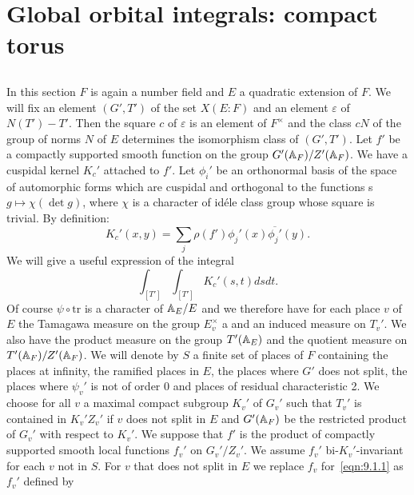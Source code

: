 \section{Global orbital integrals: compact torus}

\subsection{}

In this section $F$ is again a number field and $E$ a quadratic extension of $F$.
We will fix an element $(G', T')$ of the set $X(E:F)$ and an element $\varepsilon$ of $N(T')-T'$.
Then the square $c$ of $\varepsilon$ is an element of $F^\times$ and the class $cN$ of the group of norms $N$ of $E$ 
determines the isomorphism class of $(G', T')$.
Let $f'$ be a compactly supported smooth function on the group $G'(\mathbb{A}_F) /Z'(\mathbb{A}_F)$.
We have a cuspidal kernel $K_c'$ attached to $f'$.
Let $\phi_i'$ be an orthonormal basis of the space of automorphic forms which are cuspidal and orthogonal to the functions s$g \mapsto \chi(\det g)$, 
where $\chi$ is a character of id\'ele class group whose square is trivial.
By definition:
\begin{equation}\label{eqn:9.1.1}
    K_c'(x, y) = \sum_j \rho(f') \phi_j'(x) \overline{\phi_j'}(y).
\end{equation}
We will give a useful expression of the integral
\begin{equation}\label{eqn:9.1.2}
    \int_{[T']}\int_{[T']} K_c'(s, t) dsdt.
\end{equation}
Of course $\psi\circ\mathrm{tr}$ is a character of $\mathbb{A}_E /E$ and we therefore have for each place $v$ of $E$ the Tamagawa measure on the group $E_v^\times$ a
and an induced measure on $T_v'$.
We also have the product measure on the group $T'(\mathbb{A}_E)$ and the quotient measure on $T'(\mathbb{A}_F)/Z'(\mathbb{A}_F)$. 
We will denote by $S$ a finite set of places of $F$ containing the places at infinity, 
the ramified places in $E$, 
the places where $G'$ does not split, the places where $\psi_v'$  is not of order 0 and places of residual characteristic 2.
We choose for all $v$ a maximal compact subgroup $K_v'$ of $G_v'$ such that $T_v'$ is contained in $K_v' Z_v'$ if $v$ does not split in $E$ and $G'(\mathbb{A}_F)$ be 
the restricted product of $G_v'$ with respect to $K_v'$. 
We suppose that $f'$ is the product of compactly supported smooth local functions $f_v'$ on $G_v'/Z_v'$.
We assume $f_v'$ bi-$K_v'$-invariant for each $v$ not in $S$.
For $v$ that does not split in $E$ we replace $f_v$ for~\eqref{eqn:9.1.1} as $f_v'$ defined by
